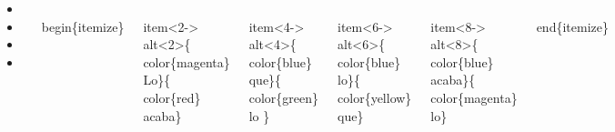 \documentclass[11pt]{beamer}
\begin{document}
\begin{frame}






\begin{block}{}

\begin{columns}
\begin{itemize}
\item<2-> 
\item<4-> 
\item<6-> 
\item<8-> 
\end{itemize}

\begin{semiverbatim}\scriptsize
\\begin\{itemize\}
\end{semiverbatim}

\begin{semiverbatim}\scriptsize
\\item<2-> \\alt<2>\{\\color\{magenta\} Lo\}\{\\color\{red\} acaba\}
\end{semiverbatim}

\begin{semiverbatim}\scriptsize
\\item<4-> \\alt<4>\{\\color\{blue\} que\}\{\\color\{green\} lo \}
\end{semiverbatim}

\begin{semiverbatim}\scriptsize
\\item<6-> \\alt<6>\{\\color\{blue\} lo\}\{\\color\{yellow\} que\}
\end{semiverbatim}


\begin{semiverbatim}\scriptsize
\\item<8-> \\alt<8>\{\\color\{blue\} acaba\}\{\\color\{magenta\} lo\}
\end{semiverbatim}

\begin{semiverbatim}\scriptsize
\\end\{itemize\}
\end{semiverbatim}




\end{columns}
\end{block}






\end{frame}
\end{document}
